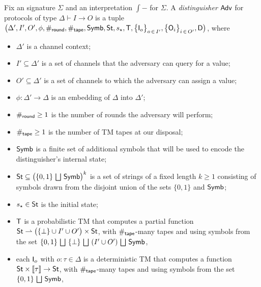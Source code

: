 \begin{definition}[Distinguishers]\label{def:disting}
Fix an \ipdl signature $\Sigma$ and an interpretation $\int{-}$ for $\Sigma$. A \emph{distinguisher} $\mathsf{Adv}$ for protocols of type $\Delta \vdash I \to O$ is a tuple $\big(\Delta', I', O', \phi, \#_{\mathsf{round}}, \#_{\mathsf{tape}}, \mathsf{Symb}, \mathsf{St}, s_\star, \mathsf{T}, \big\{\mathsf{I}_o\big\}_{o \, \in \, I'}, \big\{\mathsf{O}_i\big\}_{i \, \in \, O'}, \mathsf{D}\big)$, where

\begin{itemize}
\item $\Delta'$ is a channel context;

\item $I' \subseteq \Delta'$ is a set of channels that the adversary can query for a value;

\item $O' \subseteq \Delta'$ is a set of channels to which the adversary can assign a value;

\item $\phi : \Delta' \to \Delta$ is an embedding of $\Delta$ into $\Delta'$;

\item $\#_{\mathsf{round}} \geq 1$ is the number of rounds the adversary will perform;

\item $\#_{\mathsf{tape}} \geq 1$ is the number of TM tapes at our disposal;

\item $\mathsf{Symb}$ is a finite set of additional symbols that will be used to encode the distinguisher's internal state;

\item $\mathsf{St} \subseteq \big(\{0,1\} \, \bigsqcup \, \mathsf{Symb}\big)^k$ is a set of strings of a fixed length $k \geq 1$ consisting of symbols drawn from the disjoint union of the sets $\{0,1\}$ and $\mathsf{Symb}$;

\item $s_\star \in \mathsf{St}$ is the initial state;

\item $\mathsf{T}$ is a probabilistic TM that computes a partial function $\mathsf{St} \rightharpoonup \big(\{\bot\} \cup I' \cup O'\big) \times \mathsf{St}$, with $\#_{\mathsf{tape}}$-many tapes and using symbols from the set $\{0,1\} \, \bigsqcup \ \{\bot\} \, \bigsqcup \ (I' \cup O') \, \bigsqcup \, \Symb$,

\item each $\mathsf{I}_o$ with $o : \tau \in \Delta$ is a deterministic TM that computes a function $\mathsf{St} \times \llbracket \tau \rrbracket \to \mathsf{St}$, with $\#_{\mathsf{tape}}$-many tapes and using symbols from the set $\{0,1\} \, \bigsqcup \, \mathsf{Symb}$,


\end{itemize}
\end{definition}
